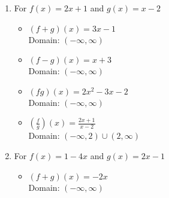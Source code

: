 \begin{enumerate}
\setcounter{enumi}{\value{HW}}

\item For $f(x) = 2x+1$ and $g(x) = x-2$

\begin{multicols}{2}

\begin{itemize}

\item $(f+g)(x) = 3x-1$ \\
      Domain: $(-\infty, \infty)$
      
      \vfill
      
      \columnbreak
      
\item $(f-g)(x) = x+3$ \\
      Domain:  $(-\infty, \infty)$


\end{itemize}

\end{multicols}

\begin{multicols}{2}

\begin{itemize}

\item $(fg)(x) = 2x^2-3x-2$ \\
      Domain: $(-\infty, \infty)$
      
      \vfill
      
      \columnbreak
      
\item $\left(\frac{f}{g}\right)(x) = \frac{2x+1}{x-2}$ \\
      Domain:  $(-\infty, 2) \cup (2, \infty)$


\end{itemize}

\end{multicols}

\item For $f(x) = 1-4x$ and $g(x) = 2x-1$

\begin{multicols}{2}

\begin{itemize}

\item $(f+g)(x) = -2x$ \\
      Domain: $(-\infty, \infty)$
      
      \vfill
      

\end{itemize}
\end{multicols}
\end{enumerate}
